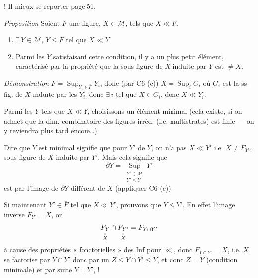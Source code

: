 \documentclass[11pt,a4paper]{article}
\begin{document}
 ! Il \ill{} mieux se reporter \ill{} page 51.




\emph{Proposition} \quad Soient $F$ une figure, $X \in \mathcal{M}$, tels que $X \ll F$.
\begin{enumerate}
  \item[a)]  $\exists\, Y \in \mathcal{M}$, $Y \leq F$ tel que $X \ll Y$
  \item[b)] Parmi les $Y$ satisfaisant cette condition, il y \struck{\ill{}} a un plus petit élément, \struck{\ill{}}  caractérisé par la propriété que la sous-figure de $X$ induite par $Y$ est $\neq X$.
\end{enumerate}

\emph{Démonstration} \quad $F = \operatorname{Sup}_{Y_i \in \overline{F}} Y_i$, donc  (par C6 (c)) $X = \operatorname{Sup}_i G_i$ où $G_i$ est la ss-fig. de $X$ induite par les $Y_i$, donc $\exists\, i$ tel que $X \in G_i$, donc $X \ll Y_i$.

Parmi les $Y$  tels que $X \ll Y$, choisissons un élément minimal (cela existe, si on admet que la dim. combinatoire des figures irréd. (i.e. multistrates) est finie --- on y reviendra \ill{} \ill{} plus tard encore…) \struck{\ill{}}

Dire que $Y$ est minimal signifie que pour $Y'$  \add{\ill{}} de $Y$, on n'a pas $X \ll Y'$ i.e. $X \neq F_{Y'}$, sous-figure de $X$ induite par $Y'$. Mais cela signifie \ill{} que
\[
  \partial Y = \operatorname*{Sup}_{\substack{Y' \in \mathcal{M} \\ Y' \leq Y}} Y'
\]
est \ill{} par l'image \ill{} de $\partial Y$ différent de $X$ (appliquer C6 (c)).

 Si maintenant $Y' \in \overline{F}$ tel que $X \ll Y'$, prouvons que  $Y \leq Y'$.  En effet l'image inverse $F_{Y'} = X$, \struck{\ill{}} or
\[
  \underset{\overset{\shortparallel}{X}}{F_Y} \cap \underset{\overset{\shortparallel}{X}}{F_{Y'}} = F_{Y \cap Y'}
\]
à cause des propriétés « fonctorielles » des Inf pour $\ll$, donc $F_{Y \cap Y'} = X$, i.e. $X$ se factorise par $Y \cap Y'$ donc par un $Z \leq Y \cap Y' \leq Y$, et donc $Z = Y$ (condition minimale) et par suite $Y = Y'$, \ill{} !
\end{document}
